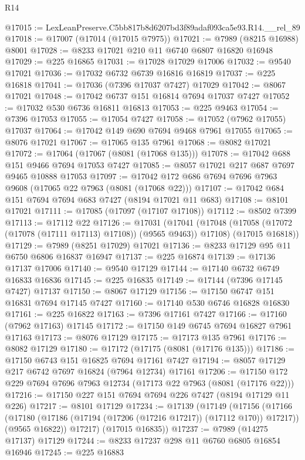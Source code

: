 \begin{lexlean}{R14}
\begin{coremodule}
@17015 := LexLeanPreserve.C5bb817b8d6207bd3f89adaf093ca5e93.R14.__rel_89
@17018 := @17007 (@17014 (@17015 @7975))
@17021 := @7989 (@8215 @16988) @8001
@17028 := @8233 @17021 @210 @11 @6740 @6807 @16820 @16948
@17029 := @225 @16865
@17031 := @17028 @17029 @17006
@17032 := @9540 @17021
@17036 := @17032 @6732 @6739 @16816 @16819
@17037 := @225 @16818
@17041 := @17036 (@7396 @17037 @7427) @17029
@17042 := @8067 @17021
@17048 := @17042 @6737 @151 @16814 @7694 @17037 @7427
@17052 := @17032 @530 @6736 @16811 @16813
@17053 := @225 @9463
@17054 := @7396 @17053
@17055 := @17054 @7427
@17058 := @17052 (@7962 @17055) @17037
@17064 := @17042 @149 @690 @7694 @9468 @7961 @17055
@17065 := @8076 @17021
@17067 := @17065 @135 @7961
@17068 := @8082 @17021
@17072 := @17064 (@17067 (@8081 (@17068 @135)))
@17078 := @17042 @688 @151 @9466 @7694 @17053 @7427
@17085 := @8057 @17021 @217 @687 @7697 @9465 @10888 @17053
@17097 := @17042 @172 @686 @7694 @7696 @7963 @9608 (@17065 @22 @7963 (@8081 (@17068 @22)))
@17107 := @17042 @684 @151 @7694 @7694 @683 @7427 (@8194 @17021 @11 @683)
@17108 := @8101 @17021
@17111 := @17085 (@17097 (@17107 @17108))
@17112 := @8502 @7399
@17113 := @17112 @22
@17126 := @17031
    (@17041
      (@17048 (@17058 (@17072 (@17078 (@17111 @17113) @17108)) (@9565 @9463)) @17108)
      (@17015 @16818))
@17129 := @7989 (@8251 @17029) @17021
@17136 := @8233 @17129 @95 @11 @6750 @6806 @16837 @16947
@17137 := @225 @16874
@17139 := @17136 @17137 @17006
@17140 := @9540 @17129
@17144 := @17140 @6732 @6749 @16833 @16836
@17145 := @225 @16835
@17149 := @17144 (@7396 @17145 @7427) @17137
@17150 := @8067 @17129
@17156 := @17150 @6747 @151 @16831 @7694 @17145 @7427
@17160 := @17140 @530 @6746 @16828 @16830
@17161 := @225 @16822
@17163 := @7396 @17161 @7427
@17166 := @17160 (@7962 @17163) @17145
@17172 := @17150 @149 @6745 @7694 @16827 @7961 @17163
@17173 := @8076 @17129
@17175 := @17173 @135 @7961
@17176 := @8082 @17129
@17180 := @17172 (@17175 (@8081 (@17176 @135)))
@17186 := @17150 @6743 @151 @16825 @7694 @17161 @7427
@17194 := @8057 @17129 @217 @6742 @7697 @16824 (@7964 @12734) @17161
@17206 := @17150 @172 @229 @7694 @7696 @7963 @12734 (@17173 @22 @7963 (@8081 (@17176 @22)))
@17216 := @17150 @227 @151 @7694 @7694 @226 @7427 (@8194 @17129 @11 @226)
@17217 := @8101 @17129
@17234 := @17139
    (@17149
      (@17156
        (@17166
          (@17180 (@17186 (@17194 (@17206 (@17216 @17217)) (@17112 @170)) @17217))
          (@9565 @16822))
        @17217)
      (@17015 @16835))
@17237 := @7989 (@14275 @17137) @17129
@17244 := @8233 @17237 @298 @11 @6760 @6805 @16854 @16946
@17245 := @225 @16883

\end{coremodule}
\end{lexlean}

